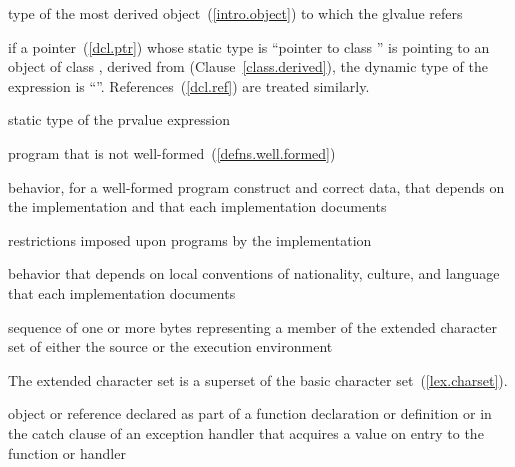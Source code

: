 %
 type of the most derived object~(\ref{intro.object}) to which the
glvalue refers\\
\begin{example}
if a pointer~(\ref{dcl.ptr})  whose static type is ``pointer to
class '' is pointing to an object of class , derived
from  (Clause~\ref{class.derived}), the dynamic type of the
expression  is ``''. References~(\ref{dcl.ref}) are
treated similarly.
\end{example}

%
 static type of the prvalue expression

%
program that is not well-formed~(\ref{defns.well.formed})

%
behavior, for a well-formed program construct and correct data, that
depends on the implementation and that each implementation documents

%
restrictions imposed upon programs by the implementation

%
behavior that depends on local conventions of nationality, culture, and
language that each implementation documents

%
sequence of one or more bytes representing a member of the extended
character set of either the source or the execution environment\\
\begin{note} The
extended character set is a superset of the basic character
set~(\ref{lex.charset}).\end{note}

%
%
%
 object or reference declared as part of a function declaration or
definition or in the catch clause of an exception handler that
acquires a value on entry to the function or handler

